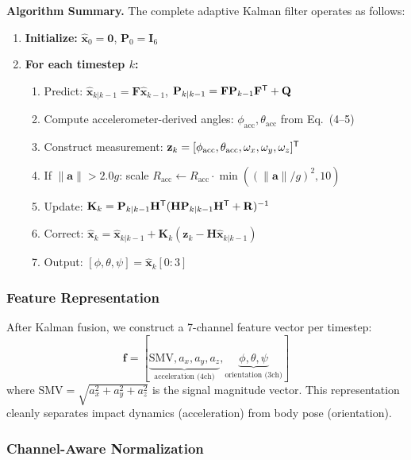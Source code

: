 \textbf{Algorithm Summary.} The complete adaptive Kalman filter operates as follows:
\begin{enumerate}
    \item \textbf{Initialize:} $\hat{\mathbf{x}}_0 = \mathbf{0}$, $\mathbf{P}_0 = \mathbf{I}_6$
    \item \textbf{For each timestep $k$:}
    \begin{enumerate}
        \item Predict: $\hat{\mathbf{x}}_{k|k-1} = \mathbf{F}\hat{\mathbf{x}}_{k-1}$, $\mathbf{P}_{k|k-1} = \mathbf{F}\mathbf{P}_{k-1}\mathbf{F}^{\mathsf{T}} + \mathbf{Q}$
        \item Compute accelerometer-derived angles: $\phi_\text{acc}, \theta_\text{acc}$ from Eq.~(4--5)
        \item Construct measurement: $\mathbf{z}_k = [\phi_\text{acc}, \theta_\text{acc}, \omega_x, \omega_y, \omega_z]^{\mathsf{T}}$
        \item If $\|\mathbf{a}\| > 2.0g$: scale $R_\text{acc} \leftarrow R_\text{acc} \cdot \min((\|\mathbf{a}\|/g)^2, 10)$
        \item Update: $\mathbf{K}_k = \mathbf{P}_{k|k-1}\mathbf{H}^{\mathsf{T}}(\mathbf{H}\mathbf{P}_{k|k-1}\mathbf{H}^{\mathsf{T}} + \mathbf{R})^{-1}$
        \item Correct: $\hat{\mathbf{x}}_k = \hat{\mathbf{x}}_{k|k-1} + \mathbf{K}_k(\mathbf{z}_k - \mathbf{H}\hat{\mathbf{x}}_{k|k-1})$
        \item Output: $[\phi, \theta, \psi] = \hat{\mathbf{x}}_k[0:3]$
    \end{enumerate}
\end{enumerate}

\subsubsection{Feature Representation}

After Kalman fusion, we construct a 7-channel feature vector per timestep:
\begin{equation}
\mathbf{f} = [\underbrace{\text{SMV}, a_x, a_y, a_z}_{\text{acceleration (4ch)}}, \underbrace{\phi, \theta, \psi}_{\text{orientation (3ch)}}]
\end{equation}
where $\text{SMV} = \sqrt{a_x^2 + a_y^2 + a_z^2}$ is the signal magnitude vector. This representation cleanly separates impact dynamics (acceleration) from body pose (orientation).

\subsubsection{Channel-Aware Normalization}

